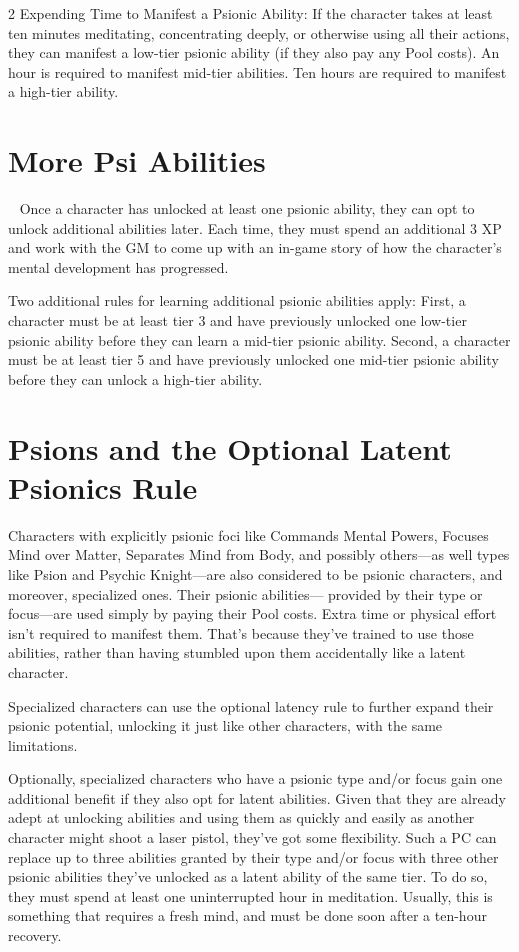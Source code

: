 \begin{multicols}{2}
Expending Time to Manifest a Psionic Ability: If the character takes at least ten minutes meditating, concentrating deeply, or otherwise using all their actions, they can manifest a low-tier psionic ability (if they also pay any Pool costs). An hour is required to manifest mid-tier abilities. Ten hours are required to manifest a high-tier ability.

\section{More Psi Abilities}
 
Once a character has unlocked at least one psionic ability, they can opt to unlock additional abilities later. Each time, they must spend an additional 3 XP and work with the GM to come up with an in-game story of how the character’s mental development has progressed. 

Two additional rules for learning additional psionic abilities apply: First, a character must be at least tier 3 and have previously unlocked one low-tier psionic ability before they can learn a mid-tier psionic ability. Second, a character must be at least tier 5 and have previously unlocked one mid-tier psionic ability before they can unlock a high-tier ability.

\section{Psions and the Optional Latent Psionics Rule}

Characters with explicitly psionic foci like Commands Mental Powers, Focuses Mind over Matter, Separates Mind from Body, and possibly others—as well types like Psion and Psychic Knight—are also considered to be psionic characters, and moreover, specialized ones. Their psionic abilities— provided by their type or focus—are used simply by paying their Pool costs. Extra time or physical effort isn’t required to manifest them. That’s because they’ve trained to use those abilities, rather than having stumbled upon them accidentally like a latent character. 

Specialized characters can use the optional latency rule to further expand their psionic potential, unlocking it just like other characters, with the same limitations.

Optionally, specialized characters who have a psionic type and/or focus gain one additional benefit if they also opt for latent abilities. Given that they are already adept at unlocking abilities and using them as quickly and easily as another character might shoot a laser pistol, they’ve got some flexibility. Such a PC can replace up to three abilities granted by their type and/or focus with three other psionic abilities they’ve unlocked as a latent ability of the same tier. To do so, they must spend at least one uninterrupted hour in meditation. Usually, this is something that requires a fresh mind, and must be done soon after a ten-hour recovery. 


\end{multicols}

